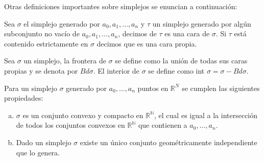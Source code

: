 %
Otras definiciones importantes sobre simplejos se enuncian a continuación:
\begin{Defi}
Sea $\sigma$ el simplejo generado por $a_0,a_1,\ldots,a_n$ y $\tau$ un simplejo generado por algún subconjunto no vacío de $a_0,a_1,\ldots,a_n$, decimos de $\tau$ es una cara de $\sigma$. Si $\tau$ está contenido estrictamente en $\sigma$ decimos que es una cara propia. 
\end{Defi}
\begin{Defi}
Sea $\sigma$ un simplejo, la frontera de $\sigma$ se define como la unión de todas sus caras propias y se denota por $Bd\sigma$. El interior de $\sigma$ se define como int $\sigma = \sigma-Bd\sigma$. 
\end{Defi}
\begin{Prop}
Para un simplejo $\sigma$ generado por $a_0,\ldots,a_n$ puntos en $\mathbb{R}^{N}$ se cumplen las siguientes propiedades:
\begin{enumerate}[(a)]
\item $\sigma$ es un conjunto convexo y compacto en $\mathbb{R^{N}}$, el cual es igual a la intersección de todos los conjuntos convexos en $\mathbb{R^{N}}$ que contienen a $a_0,\ldots,a_n$.
\item Dado un simplejo $\sigma$ existe un único conjunto geométricamente independiente que lo genera.
\end{enumerate}
\end{Prop}
